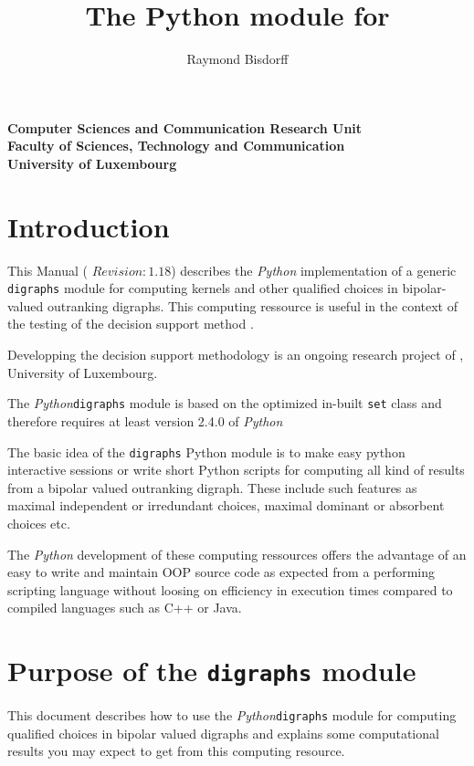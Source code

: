 \documentclass{article}
\title{The Python \Dg module for \Ruby}
\author{Raymond Bisdorff}
\date{}
\newcommand{\+}{\verb+}
\renewcommand{\*}{\back{}}
\newcommand{\Ruby}{{\texorhtml{\sc{Rubis}}{\emph{Rubis}}}\xspace }
\newcommand{\Dg}{\texttt{digraphs}\xspace }
\newcommand{\Py}{\emph{Python}\xspace }
\begin{document}
\W\begin{center}
  \maketitle
\T\begin{center}
  {\small\bf Computer Sciences and Communication Research Unit}\\[-0.7ex]
  {\small\bf Faculty of Sciences, Technology and Communication}\\[-0.7ex]
  {\small\bf University of Luxembourg}
\end{center}

\T\section{Introduction}

This Manual ( $Revision: 1.18 $) describes the \Py implementation of a generic \Dg module  for computing kernels and other qualified choices in bipolar-valued outranking digraphs. This computing ressource is useful in the context of the testing of the \Ruby decision support method \cite{Bisdorff05}.

Developping the \Ruby decision support methodology is an ongoing research project of , University of Luxembourg.

The \Py \Dg module is based on the optimized in-built \texttt{set} class and therefore requires at least  version 2.4.0 of \Py 

\label{philosophy}
The basic idea of the \Dg Python module is to make easy python interactive sessions or write short Python scripts for computing all kind of results from a bipolar valued outranking digraph. These include such features as maximal independent or irredundant choices, maximal dominant or absorbent choices etc. 

The \Py development of these computing ressources offers the advantage of an easy to write and maintain OOP source code as expected from a performing scripting language without loosing on efficiency in execution times compared to compiled languages such as C++ or Java. 


\section{Purpose of the \Dg module}
{\label{sec:purpose}}
This document describes how to use the \Py \Dg module for computing qualified choices in bipolar valued digraphs and explains some computational results you may expect to get from this computing resource. 


\end{center}
\end{document}
